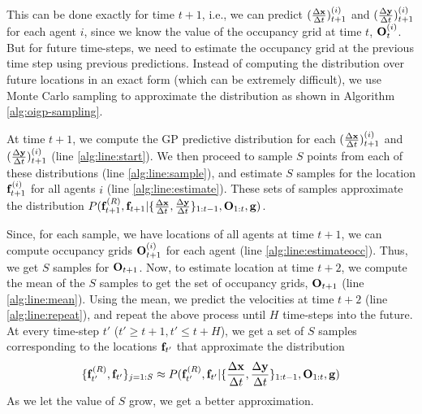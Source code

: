 This can be done exactly for time $t+1$, i.e., we can predict
$(\frac{\Delta \mathbf{x}}{\Delta t})_{t+1}^{(i)}$ and $(\frac{\Delta \mathbf{y}}{\Delta t})_{t+1}^{(i)}$ for each agent $i$,
since we know the value of the occupancy grid at time $t$,
$\mathbf{O}^{(i)}_t$. But for future time-steps, we need to estimate the
occupancy grid at the previous time step using previous
predictions. Instead of computing the distribution over future
locations in an exact form (which can be extremely difficult), we use
Monte Carlo sampling to approximate the distribution as shown in
Algorithm \ref{alg:oigp-sampling}.

At time $t+1$, we compute the GP predictive distribution
\cite{rasmussen06} for each $(\frac{\Delta \mathbf{x}}{\Delta t})_{t+1}^{(i)}$ and
$(\frac{\Delta \mathbf{y}}{\Delta t})_{t+1}^{(i)}$ (line \ref{alg:line:start}).
We then proceed to sample $S$ points from each of these distributions
(line \ref{alg:line:sample}), and estimate $S$ samples for the
location $\mathbf{f}_{t+1}^{(i)}$ for all agents $i$ (line
\ref{alg:line:estimate}).  These sets of samples approximate the
distribution
$P(\mathbf{f}^{(R)}_{t+1}, \mathbf{f}_{t+1}|\{\frac{\Delta \mathbf{x}}{\Delta t}, \frac{\Delta \mathbf{y}}{\Delta t}\}_{1:t-1},
\mathbf{O}_{1:t}, \mathbf{g})$.

Since, for each sample, we have locations of all agents at time $t+1$,
we can compute occupancy grids $\mathbf{O}^{(i)}_{t+1}$ for each agent
(line \ref{alg:line:estimateocc}). Thus, we get $S$ samples for
$\mathbf{O}_{t+1}$.  Now, to estimate location at time $t+2$, we compute
the mean of the $S$ samples to get the set of occupancy grids,
$\mathbf{O}_{t+1}$ (line \ref{alg:line:mean}).  Using the mean,
%
we predict the velocities at time $t+2$ (line \ref{alg:line:repeat}),
and repeat the above process until $H$ time-steps into the future. At
every time-step $t'$ ($t' \geq t+1, t' \leq t+H$), we get a set of $S$
samples corresponding to the locations $\mathbf{f}_{t'}$ that approximate
the distribution
\begin{align*}
  \{\mathbf{f}^{(R)}_{t'}, \mathbf{f}_{t'}\}_{j=1:S} \approx P(\mathbf{f}^{(R)}_{t'}, \mathbf{f}_{t'}|\{\frac{\Delta \mathbf{x}}{\Delta t}, \frac{\Delta \mathbf{y}}{\Delta t}\}_{1:t-1}, \mathbf{O}_{1:t}, \mathbf{g})
\end{align*}
As we let the value of $S$ grow, we get a better approximation.


